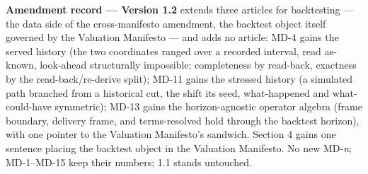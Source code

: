 \documentclass[11pt,a4paper]{article}
\begin{document}
\medskip
\noindent\textbf{Amendment record --- Version 1.2} extends three articles for
backtesting --- the data side of the cross-manifesto amendment, the backtest
object itself governed by the Valuation Manifesto --- and adds no article: MD-4
gains the served history (the two coordinates ranged over a recorded interval,
read as-known, look-ahead structurally impossible; completeness by read-back,
exactness by the read-back/re-derive split); MD-11 gains the stressed history (a
simulated path branched from a historical cut, the shift its seed,
what-happened and what-could-have symmetric); MD-13 gains the horizon-agnostic
operator algebra (frame boundary, delivery frame, and terms-resolved hold
through the backtest horizon), with one pointer to the Valuation Manifesto's
sandwich. Section 4 gains one sentence placing the backtest object in the
Valuation Manifesto. No new MD-\emph{n}; MD-1--MD-15 keep their numbers; 1.1
stands untouched.
\end{document}
